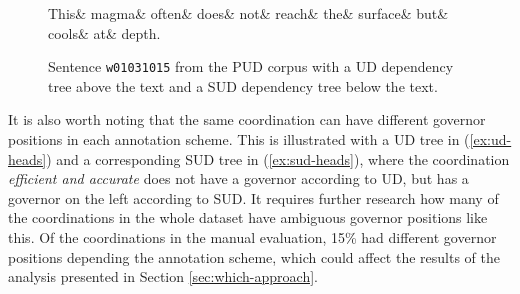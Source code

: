 \begin{figure}
\begin{exe}
	\ex\label{ex:rep-UD-magma}
	\begin{dependency}[hide label, baseline=-\the\dimexpr\fontdimen22\textfont2\relax]
		\begin{deptext}
			This\& magma\& often\& does\& not\& reach\& the\& surface\& but\& cools\& at\& depth.\\
		\end{deptext}
	
\end{dependency}
\end{exe}
\caption{Sentence \texttt{w01031015} from the PUD corpus \citep{pud} with a UD dependency tree above the text and a SUD dependency tree below the text.}
\end{figure}	

It is also worth noting that the same coordination can have different governor positions in each annotation scheme. This is illustrated with a UD tree in (\ref{ex:ud-heads}) and a corresponding SUD tree in (\ref{ex:sud-heads}), where the coordination \textsl{efficient and accurate} does not have a governor according to UD, but has a governor on the left according to SUD. It requires further research how many of the coordinations in the whole dataset have ambiguous governor positions like this. Of the coordinations in the manual evaluation, 15\% had different governor positions depending the annotation scheme, which could affect the results of the analysis presented in Section \ref{sec:which-approach}.

